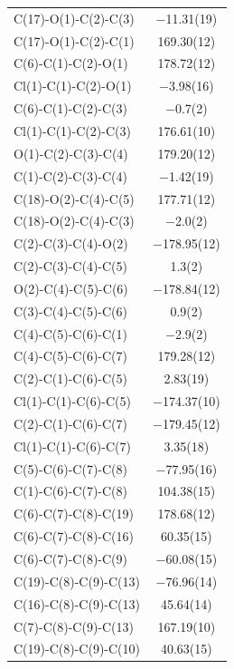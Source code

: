 \begin{center}
\tablefirsthead{%
\toprule}
\tablelasttail{\bottomrule}
{\footnotesize \singlespacing
\begin{supertabular}{p{1.5in}c}
C(17)-O(1)-C(2)-C(3)&$-$11.31(19)\\
C(17)-O(1)-C(2)-C(1)&169.30(12)\\
C(6)-C(1)-C(2)-O(1)&178.72(12)\\
Cl(1)-C(1)-C(2)-O(1)&$-$3.98(16)\\
C(6)-C(1)-C(2)-C(3)&$-$0.7(2)\\
Cl(1)-C(1)-C(2)-C(3)&176.61(10)\\
O(1)-C(2)-C(3)-C(4)&179.20(12)\\
C(1)-C(2)-C(3)-C(4)&$-$1.42(19)\\
C(18)-O(2)-C(4)-C(5)&177.71(12)\\
C(18)-O(2)-C(4)-C(3)&$-$2.0(2)\\
C(2)-C(3)-C(4)-O(2)&$-$178.95(12)\\
C(2)-C(3)-C(4)-C(5)&1.3(2)\\
O(2)-C(4)-C(5)-C(6)&$-$178.84(12)\\
C(3)-C(4)-C(5)-C(6)&0.9(2)\\
C(4)-C(5)-C(6)-C(1)&$-$2.9(2)\\
C(4)-C(5)-C(6)-C(7)&179.28(12)\\
C(2)-C(1)-C(6)-C(5)&2.83(19)\\
Cl(1)-C(1)-C(6)-C(5)&$-$174.37(10)\\
C(2)-C(1)-C(6)-C(7)&$-$179.45(12)\\
Cl(1)-C(1)-C(6)-C(7)&3.35(18)\\
C(5)-C(6)-C(7)-C(8)&$-$77.95(16)\\
C(1)-C(6)-C(7)-C(8)&104.38(15)\\
C(6)-C(7)-C(8)-C(19)&178.68(12)\\
C(6)-C(7)-C(8)-C(16)&60.35(15)\\
C(6)-C(7)-C(8)-C(9)&$-$60.08(15)\\
C(19)-C(8)-C(9)-C(13)&$-$76.96(14)\\
C(16)-C(8)-C(9)-C(13)&45.64(14)\\
C(7)-C(8)-C(9)-C(13)&167.19(10)\\
C(19)-C(8)-C(9)-C(10)&40.63(15)\\

\end{supertabular}}
\end{center}
